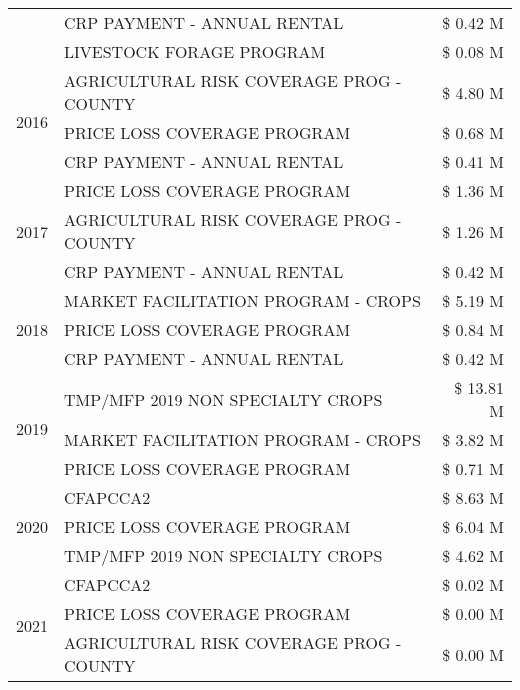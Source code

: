 \begin{tabular}{llr}
 & CRP PAYMENT - ANNUAL RENTAL & \$ 0.42 M \\
 & LIVESTOCK FORAGE PROGRAM & \$ 0.08 M \\
\cline{1-3}
\multirow[t]{3}{*}{2016} & AGRICULTURAL RISK COVERAGE PROG - COUNTY & \$ 4.80 M \\
 & PRICE LOSS COVERAGE PROGRAM & \$ 0.68 M \\
 & CRP PAYMENT - ANNUAL RENTAL & \$ 0.41 M \\
\cline{1-3}
\multirow[t]{3}{*}{2017} & PRICE LOSS COVERAGE PROGRAM & \$ 1.36 M \\
 & AGRICULTURAL RISK COVERAGE PROG - COUNTY & \$ 1.26 M \\
 & CRP PAYMENT - ANNUAL RENTAL & \$ 0.42 M \\
\cline{1-3}
\multirow[t]{3}{*}{2018} & MARKET FACILITATION PROGRAM - CROPS & \$ 5.19 M \\
 & PRICE LOSS COVERAGE PROGRAM & \$ 0.84 M \\
 & CRP PAYMENT - ANNUAL RENTAL & \$ 0.42 M \\
\cline{1-3}
\multirow[t]{3}{*}{2019} & TMP/MFP 2019 NON SPECIALTY CROPS & \$ 13.81 M \\
 & MARKET FACILITATION PROGRAM - CROPS & \$ 3.82 M \\
 & PRICE LOSS COVERAGE PROGRAM & \$ 0.71 M \\
\cline{1-3}
\multirow[t]{3}{*}{2020} & CFAPCCA2 & \$ 8.63 M \\
 & PRICE LOSS COVERAGE PROGRAM & \$ 6.04 M \\
 & TMP/MFP 2019 NON SPECIALTY CROPS & \$ 4.62 M \\
\cline{1-3}
\multirow[t]{3}{*}{2021} & CFAPCCA2 & \$ 0.02 M \\
 & PRICE LOSS COVERAGE PROGRAM & \$ 0.00 M \\
 & AGRICULTURAL RISK COVERAGE PROG - COUNTY & \$ 0.00 M \\
\cline{1-3}
\bottomrule
\end{tabular}
